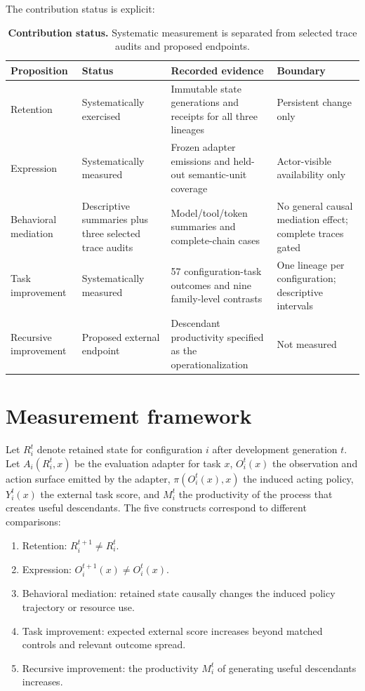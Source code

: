 \documentclass[10pt,twocolumn]{article}
\providecommand{\tightlist}{\setlength{\itemsep}{0pt}\setlength{\parskip}{0pt}}
\begin{document}
The contribution status is explicit:

\begin{table}[t]
\caption*{\textbf{Contribution status.} Systematic measurement is separated from selected trace audits and proposed endpoints.}
\centering\scriptsize
\begin{tabularx}{\textwidth}{@{}p{}p{}X X@{}}
\toprule
\textbf{Proposition} & \textbf{Status} & \textbf{Recorded evidence} & \textbf{Boundary}\\
\midrule
Retention & Systematically exercised & Immutable state generations and receipts for all three lineages & Persistent change only\\
Expression & Systematically measured & Frozen adapter emissions and held-out semantic-unit coverage & Actor-visible availability only\\
Behavioral mediation & Descriptive summaries plus three selected trace audits & Model/tool/token summaries and complete-chain cases & No general causal mediation effect; complete traces gated\\
Task improvement & Systematically measured & 57 configuration-task outcomes and nine family-level contrasts & One lineage per configuration; descriptive intervals\\
Recursive improvement & Proposed external endpoint & Descendant productivity specified as the operationalization & Not measured\\
\bottomrule
\end{tabularx}
\end{table}

\section{Measurement framework}\label{measurement-framework}

Let \(R_i^t\) denote retained state for configuration \(i\) after
development generation \(t\). Let \(A_i(R_i^t, x)\) be the evaluation
adapter for task \(x\), \(O_i^t(x)\) the observation and action surface
emitted by the adapter, \(\pi(O_i^t(x), x)\) the induced acting policy,
\(Y_i^t(x)\) the external task score, and \(M_i^t\) the productivity of
the process that creates useful descendants. The five constructs
correspond to different comparisons:

\begin{enumerate}
\def\labelenumi{\arabic{enumi}.}
\tightlist
\item
  Retention: \(R_i^{t+1} \ne R_i^t\).
\item
  Expression: \(O_i^{t+1}(x) \ne O_i^t(x)\).
\item
  Behavioral mediation: retained state causally changes the induced
  policy trajectory or resource use.
\item
  Task improvement: expected external score increases beyond matched
  controls and relevant outcome spread.
\item
  Recursive improvement: the productivity \(M_i^t\) of generating useful
  descendants increases.
\end{enumerate}
\end{document}
